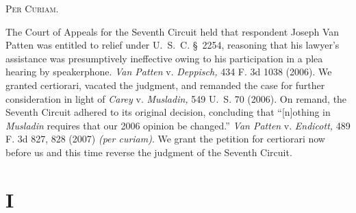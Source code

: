 
\setcounter{page}{120}

  \textsc{Per Curiam.}

  The Court of Appeals for the Seventh Circuit held that respondent Joseph Van Patten was entitled to relief under U.~S.~C. \S~2254, reasoning that his lawyer's assistance was presumptively ineffective owing to his participation in a plea hearing by speakerphone. \emph{Van Patten} v. \emph{Deppisch,} 434 F. 3d 1038 (2006). We granted certiorari, vacated the judgment, and remanded the case for further consideration in light of \emph{Carey} v. \emph{Musladin,} 549 U.~S. 70 (2006). On remand, the Seventh Circuit adhered to its original decision, concluding that ``[n]othing in \emph{Musladin} requires that our 2006 opinion be changed.'' \emph{Van Patten} v. \emph{Endicott,} 489 F. 3d 827, 828 (2007) \emph{(per curiam)}. We grant the petition for certiorari now before us and this time reverse the judgment of the Seventh Circuit.

\section{I}

